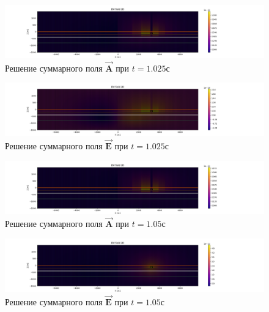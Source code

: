 \begin{figure}
	\centering
	\includegraphics[width=1.0\linewidth]{images/Answer_A_Istage_time_layer_1.0250000000000006.png}
	\caption{Решение суммарного поля $\overrightarrow{\textbf{A}}$ при $t = 1.025с$}
	\label{fig:A_Istage_t1}
\end{figure} 


\begin{figure}
	\centering
	\includegraphics[width=1.0\linewidth]{images/Answer_E_Istage_time_layer_1.0250000000000006.png}
	\caption{Решение суммарного поля $\overrightarrow{\textbf{E}}$ при $t = 1.025с$}
	\label{fig:E_Istage_t1}
\end{figure} 

\begin{figure}
	\centering
	\includegraphics[width=1.0\linewidth]{images/Answer_A_Istage_time_layer_1.05.png}
	\caption{Решение суммарного поля $\overrightarrow{\textbf{A}}$ при $t = 1.05с$}
	\label{fig:A_Istage_t2}
\end{figure} 


\begin{figure}
	\centering
	\includegraphics[width=1.0\linewidth]{images/Answer_E_Istage_time_layer_1.05.png}
	\caption{Решение суммарного поля $\overrightarrow{\textbf{E}}$ при $t = 1.05с$}
	\label{fig:E_Istage_t2}
\end{figure} 

